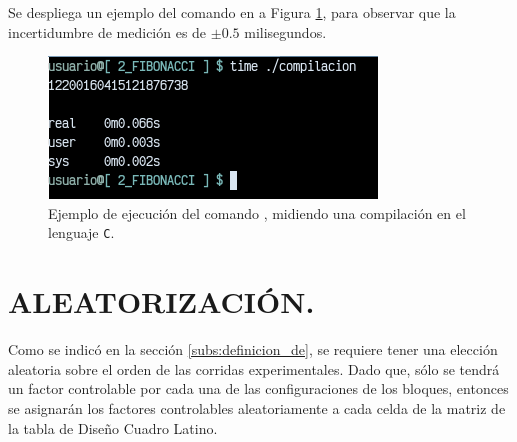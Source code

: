\documentclass[11pt,a4paper]{article}
\begin{document}
\newpage
Se despliega un ejemplo del comando en a Figura \ref{fig:incert}, para observar que la incertidumbre de medición es de \(\pm 0.5\) milisegundos.
\begin{figure}[hbt!]
	\centering
	\includegraphics[width= 0.4 \linewidth]{IMAGENES/3/incertidumbre.png}
	\caption{Ejemplo de ejecución del comando , midiendo una compilación en el lenguaje \texttt{C}.}
	\label{fig:incert}
\end{figure}


\section{ALEATORIZACIÓN.} %
\label{sec:aleatorizacion}
Como se indicó en la sección \ref{subs:definicion_de}, se requiere tener una elección aleatoria sobre el orden de las corridas experimentales.
Dado que, sólo se tendrá un factor controlable por cada una de las configuraciones de los bloques, entonces se asignarán los factores controlables aleatoriamente a cada celda de la matriz de la tabla de Diseño Cuadro Latino. \\[2mm]
\end{document}
